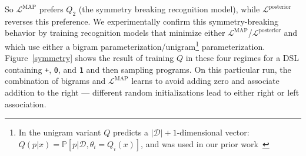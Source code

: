 \documentclass{article}
\newcommand{\code}[1]{{\footnotesize\texttt{#1}}}
\newcommand{\probability}{\mathds{P}} %
\begin{document}
So $\mathcal{L}^{\text{MAP}}$ prefers $Q_2$ (the symmetry breaking
recognition model), while $\mathcal{L}^{\text{posterior}}$ reverses
this preference.  We experimentally confirm this symmetry-breaking
behavior by training recognition models that minimize either
$\mathcal{L}^{\text{MAP}}$/$\mathcal{L}^\text{posterior}$ and which
use either a bigram parameterization/unigram\footnote{In the unigram variant $Q$ predicts a $|\mathcal{D}| + 1$-dimensional vector: $Q(p|x) = \probability[p|\mathcal{D},\theta_i = Q_i(x)]$,
  and was used in our prior work~\cite{ecc}} parameterization.
Figure~\ref{symmetry} shows the result of training $Q$ in these four regimes for a DSL containing \code{+}, \code{0}, and \code{1}
and then sampling programs.
On this particular run,
the combination of
bigrams and $\mathcal{L}^{\text{MAP}}$ learns to
avoid adding zero and associate addition to the right ---
different random initializations
lead to either right or left association.
\end{document}
